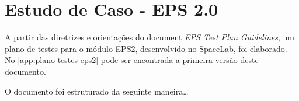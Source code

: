 \chapter{Estudo de Caso - EPS 2.0}

A partir das diretrizes e orientações do document \textit{EPS Test Plan Guidelines}, um plano de testes para o módulo \gls{EPS2}, desenvolvido no SpaceLab, foi elaborado.
No \autoref{app:plano-testes-eps2} pode ser encontrada a primeira versão deste documento.

O documento foi estruturado da seguinte maneira\dots